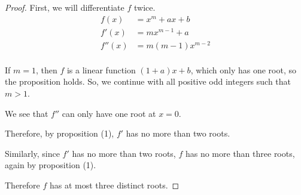\documentclass[../hw4.tex]{subfiles}
\begin{document}
\begin{proof}%
    First, we will differentiate $f$ twice.
    \begin{align*}
        f(x) &= x^m+ax+b \\
        f'(x) &= mx^{m-1}+a \\
        f''(x) &= m(m-1)x^{m-2} \\
    \end{align*}

    If $m=1$, then $f$ is a linear function $(1+a)x+b$, which only has one root, so the proposition holds. So, we continue with all positive odd integers such that $m>1$.

    We see that $f''$ can only have one root at $x=0$.

    Therefore, by proposition (1), $f'$ has no more than two roots.

    Similarly, since $f'$ has no more than two roots, $f$ has no more than three roots, again by proposition (1).
 
    Therefore $f$ has at most three distinct roots.





    

\end{proof}
\end{document}
